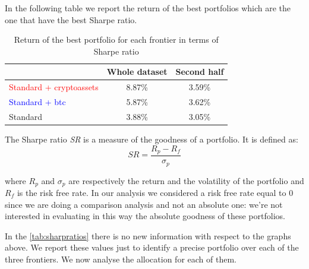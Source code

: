 In the following table we report the return of the best portfolios which are the one that have the best Sharpe ratio.

\begin{table}[H]
    \centering
    \begin{tabular}{l|c|c}
         & Whole dataset & Second half \\
         \hline
         \textcolor{red}{Standard + cryptoassets} & 8.87\% & 3.59\% \\
         \textcolor{blue}{Standard + btc} & 5.87\% & 3.62\% \\
         Standard & 3.88\% & 3.05\% \\
    \end{tabular}
    \caption{Return of the best portfolio for each frontier in terms of Sharpe ratio}
    \label{tab:sharpratios}
\end{table}

The Sharpe ratio \textit{SR} is a measure of the goodness of a portfolio. It is defined as:
\begin{equation}
    SR = \frac{R_p - R_f}{\sigma_p}
\end{equation}

where $R_p$ and $\sigma_p$ are respectively the return and the volatility of the portfolio and $R_f$ is  the risk free rate. In our analysis we considered a risk free rate equal to 0 since we are doing a comparison analysis and not an absolute one: we're not interested in evaluating in this way the absolute goodness of these portfolios.

In the \autoref{tab:sharpratios} there is no new information with respect to the graphs above. We report these values just to identify a precise portfolio over each of the three frontiers. We now analyse the allocation for each of them.

